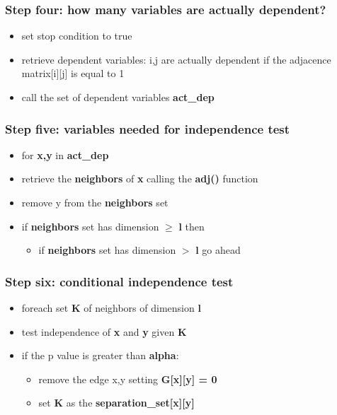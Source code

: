 \documentclass[xcolor ={table,usenames,dvipsnames}]{beamer}
\theoremstyle{definition}
\begin{document}
\begin{frame}
\frametitle{Step four: how many variables are actually dependent?}
\begin{itemize}
	\item set stop condition to true
	\item retrieve dependent variables: i,j are actually dependent if the adjacence matrix[i][j] is equal to 1
	\item call the set of dependent variables \textbf{act\_dep}
\end{itemize}

\end{frame}
\begin{frame}
\frametitle{Step five: variables needed for independence test}
\begin{itemize}
	\item for \textbf{x,y} in \textbf{act\_dep}
	\item retrieve the \textbf{neighbors} of \textbf{x} calling the \textbf{adj()} function
	\item remove y from the \textbf{neighbors} set
	\item if \textbf{neighbors} set has dimension $\ge$ \textbf{l} then \begin{itemize}
	\item if \textbf{neighbors} set has dimension $>$ \textbf{l} go ahead
	\end{itemize}
\end{itemize}
\end{frame}
\begin{frame}
\frametitle{Step six: conditional independence test}
\begin{itemize}
	\item foreach set \textbf{K} of neighbors of dimension \textbf{l}
	\item test independence of \textbf{x} and \textbf{y} given \textbf{K}
	\item if the p value is greater than \textbf{alpha}:
	\begin{itemize}
		\item remove the edge x,y setting \textbf{G[x][y] = 0}
		\item set \textbf{K} as the \textbf{separation\_set[x][y]}
	\end{itemize}
\end{itemize}
\end{frame}
\end{document}
